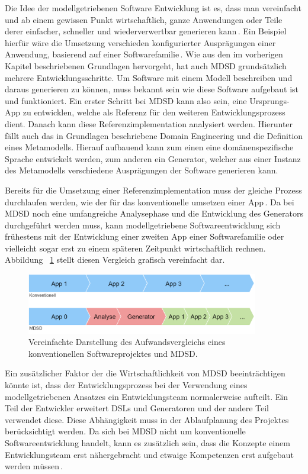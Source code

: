\documentclass[12pt,oneside,a4paper,parskip]{scrbook}
\begin{document}
Die Idee der modellgetriebenen Software Entwicklung ist es, dass man vereinfacht und ab einem gewissen Punkt wirtschaftlich, ganze Anwendungen oder Teile derer einfacher, schneller und wiederverwertbar generieren kann\,\cite[S. 14f.]{stahl2007}. Ein Beispiel hierfür wäre die Umsetzung verschieden konfigurierter Ausprägungen einer Anwendung, basierend auf einer Softwarefamilie\,\cite[S. 237ff.]{stahl2007}. Wie aus den im vorherigen Kapitel beschriebenen Grundlagen hervorgeht, hat auch MDSD grundsätzlich mehrere Entwicklungsschritte. Um Software mit einem Modell beschreiben und daraus generieren zu können, muss bekannt sein wie diese Software aufgebaut ist und funktioniert. Ein erster Schritt bei MDSD kann also sein, eine Ursprungs-App zu entwicklen, welche als Referenz für den weiteren Entwicklungsprozess dient. Danach kann diese Referenzimplementation analysiert werden. Hierunter fällt auch das in Grundlagen beschriebene Domain Engineering und die Definition eines Metamodells. Hierauf aufbauend kann zum einen eine domänenspezifische Sprache entwickelt werden, zum anderen ein Generator, welcher aus einer Instanz des Metamodells verschiedene Ausprägungen der Software generieren kann.

Bereits für die Umsetzung einer Referenzimplementation muss der gleiche Prozess durchlaufen werden, wie der für das konventionelle umsetzen einer App\,\cite[S. 219f.]{stahl2007}. Da bei MDSD noch eine umfangreiche Analysephase und die Entwicklung des Generators durchgeführt werden muss, kann modellgetriebene Softwareentwicklung sich frühestens mit der Entwicklung einer zweiten App einer Softwarefamilie oder vielleicht sogar erst zu einem späteren Zeitpunkt wirtschaftlich rechnen. Abbildung ~\ref{fig:vgl1} stellt diesen Vergleich grafisch vereinfacht dar.

\begin{figure}[htbp]
	\centering
	\includegraphics[width=0.9\textwidth]{bilder/vergleich_1}
	\caption{Vereinfachte Darstellung des Aufwandsvergleichs eines konventionellen Softwareprojektes und MDSD.}
	\label{fig:vgl1}
\end{figure}

Ein zusätzlicher Faktor der die Wirtschaftlichkeit von MDSD beeinträchtigen könnte ist, dass der Entwicklungsprozess bei der Verwendung eines modellgetriebenen Ansatzes ein Entwicklungsteam normalerweise aufteilt. Ein Teil der Entwickler erweitert DSLs und Generatoren und der andere Teil verwendet diese. Diese Abhängigkeit muss in der Ablaufplanung des Projektes berücksichtigt werden. Da sich bei MDSD nicht um konventionelle Softwareentwicklung handelt, kann es zusätzlich sein, dass die Konzepte einem Entwicklungsteam erst nähergebracht und etwaige Kompetenzen erst aufgebaut werden müssen\,\cite[S. 44ff.]{voelter2013}.
\end{document}
